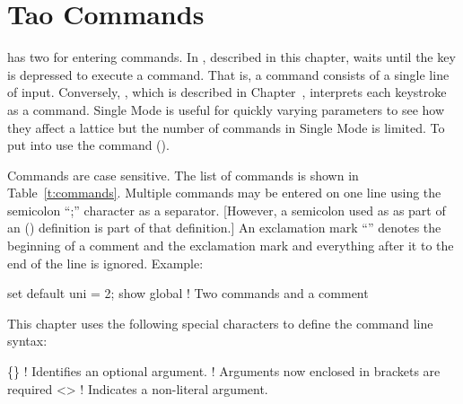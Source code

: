 
\chapter{Tao Commands}
\label{c:command}

\tao has two  for entering commands. In , described in this chapter, \tao
waits until the  key is depressed to execute a command. That is, a command consists of a
single line of input. Conversely, , which is described in Chapter~,
interprets each keystroke as a command. Single Mode is useful for quickly varying parameters to see
how they affect a lattice but the number of commands in Single Mode is limited. To put \tao into
 use the  command ().

Commands are case sensitive. The list of commands is shown in Table~\ref{t:commands}. Multiple
commands may be entered on one line using the semicolon ``;'' character as a separator.  [However, a
semicolon used as as part of an  () definition is part of that definition.]
An exclamation mark ``\vn{!}''  denotes the beginning of a comment and the exclamation mark and
everything after it to the end of the line is ignored.  Example:
\begin{example}
  set default uni = 2; show global  ! Two commands and a comment
\end{example}

This chapter uses the following special characters to define the command line syntax:
\begin{example}
  \{\}        ! Identifies an optional argument.
            !   Arguments now enclosed in brackets are required
  <>        ! Indicates a non-literal argument.
\end{example}

